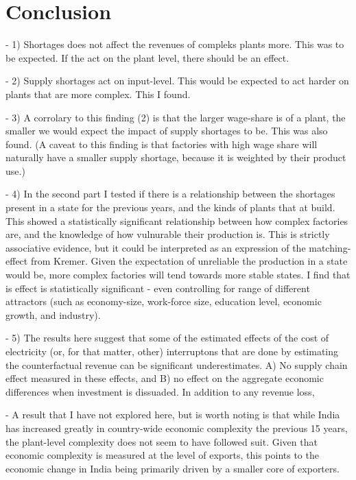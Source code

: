 \documentclass[11pt]{article}
\begin{document}

\newpage

\section{Conclusion}%
\label{sec:conclusion}

- 1) Shortages does not affect the revenues of compleks plants more. This was to be expected. If the act on the plant level, there should be an effect.

- 2) Supply shortages act on input-level. This would be expected to act harder on plants that are more complex. This I found.

- 3) A corrolary to this finding (2) is that the larger wage-share is of a plant, the smaller we would expect the impact of supply shortages to be. This was also found. (A caveat to this finding is that factories with high wage share will naturally have a smaller supply shortage, because it is weighted by their product use.)

- 4) In the second part I tested if there is a relationship between the shortages present in a state for the previous years, and the kinds of plants that at build. This showed a statistically significant relationship between how complex factories are, and the knowledge of how vulnurable their production is. This is strictly associative evidence, but it could be interpreted as an expression of the matching-effect from Kremer. Given the expectation of unreliable the production in a state would be, more complex factories will tend towards more stable states. I find that is effect is statistically significant - even controlling for range of different attractors (such as economy-size, work-force size, education level, economic growth, and industry).

- 5) The results here suggest that some of the estimated effects of the cost of electricity (or, for that matter, other) interruptons that are done by estimating the counterfactual revenue can be significant underestimates. A) No supply chain effect measured in these effects, and B) no effect on the aggregate economic differences when investment is dissuaded. In addition to any revenue loss, 

- A result that I have not explored here, but is worth noting is that while India has increased greatly in country-wide economic complexity the previous 15 years, the plant-level complexity does not seem to have followed suit. Given that economic complexity is measured at the level of exports, this points to the economic change in India being primarily driven by a smaller core of exporters.
\end{document}
